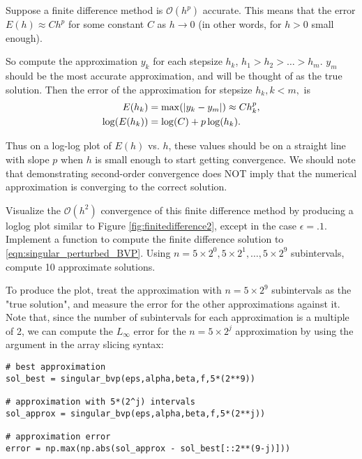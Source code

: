 Suppose a finite difference method is $\mathcal{O}(h^p)$ accurate.
This means that the error $E(h) \approx Ch^p$ for some constant $C$ as $h \to 0$ (in other words, for $h>0$ small enough).

So compute the approximation $y_k$ for each stepsize $h_k$, $h_1 > h_2> \ldots>h_m$.
$y_m$ should be the most accurate approximation, and will be thought of as the true solution.
Then the error of the approximation for
stepsize $h_k, k < m,$ is
\begin{align*}
	E(h_k) &= \max( \left\lvert y_k - y_m\right\rvert) \approx C h_k^p ,\\
	\log(E(h_k)) &= \log(C) + p \log(h_k).
\end{align*}

Thus on a log-log plot of $E(h)$ vs. $h$, these values should be on a straight line with slope $p$ when $h$ is small enough to start getting convergence. We should note that demonstrating second-order convergence does NOT imply that the numerical approximation is converging to the correct solution.


\begin{problem}
Visualize the $\mathcal{O}(h^2)$ convergence of this finite difference method by producing a loglog plot similar to Figure \ref{fig:finitedifference2}, except in the case $\epsilon=.1$. Implement a function  to compute the finite difference solution to \ref{eqn:singular_perturbed_BVP}. Using $n = 5 \times 2^0,5 \times 2^1, \dots ,5 \times 2^9$ subintervals, compute 10 approximate solutions. 


To produce the plot, treat the approximation with $n = 5 \times 2^9$ subintervals as the "true solution", and measure the error for the other approximations against it. Note that, since the number of subintervals for each approximation is a multiple of 2, we can compute the $L_{\infty}$ error for the $n=5 \times 2^j$ approximation by using the  argument in the array slicing syntax:
\begin{lstlisting}
# best approximation
sol_best = singular_bvp(eps,alpha,beta,f,5*(2**9))

# approximation with 5*(2^j) intervals
sol_approx = singular_bvp(eps,alpha,beta,f,5*(2**j))

# approximation error
error = np.max(np.abs(sol_approx - sol_best[::2**(9-j)]))
\end{lstlisting}
\end{problem}

